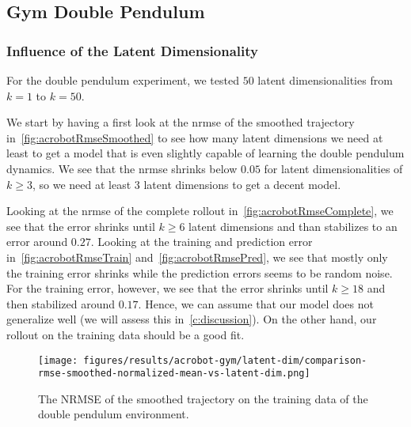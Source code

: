 	\subsection{Gym Double Pendulum} %

		\subsubsection{Influence of the Latent Dimensionality}
			For the double pendulum experiment, we tested \(50\) latent dimensionalities from \( k = 1 \) to \( k = 50 \).

			We start by having a first look at the \ac{nrmse} of the smoothed trajectory in~\autoref{fig:acrobotRmseSmoothed} to see how many latent dimensions we need at least to get a model that is even slightly capable of learning the double pendulum dynamics. We see that the \ac{nrmse} shrinks below \(0.05\) for latent dimensionalities of \( k \geq 3 \), so we need at least \(3\) latent dimensions to get a decent model.

			Looking at the \ac{nrmse} of the complete rollout in~\autoref{fig:acrobotRmseComplete}, we see that the error shrinks until \( k \geq 6 \) latent dimensions and than stabilizes to an error around \( 0.27 \). Looking at the training and prediction error in~\autoref{fig:acrobotRmseTrain} and~\autoref{fig:acrobotRmsePred}, we see that mostly only the training error shrinks while the prediction errors seems to be random noise. For the training error, however, we see that the error shrinks until \( k \geq 18 \) and then stabilized around \( 0.17 \). Hence, we can assume that our model does not generalize well (we will assess this in~\autoref{c:discussion}). On the other hand, our rollout on the training data should be a good fit.

			\begin{figure}
				\centering
				\texttt{[image: figures/results/acrobot-gym/latent-dim/comparison-rmse-smoothed-normalized-mean-vs-latent-dim.png]}
				\caption[Error of the smoothed trajectory on the training data of the double pendulum experiment]{The NRMSE of the smoothed trajectory on the training data of the double pendulum environment.}
				\label{fig:acrobotRmseSmoothed}
			\end{figure}

